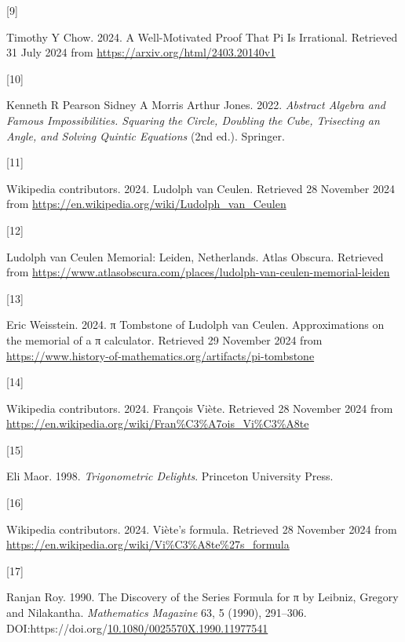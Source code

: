 \documentclass[
  a4paper,
]{article}
\newlength{\cslhangindent}
\newlength{\csllabelwidth}
\newenvironment{CSLReferences}[2] %
 {\begin{list}{}{%
  \setlength{\itemindent}{0pt}
  \setlength{\leftmargin}{0pt}
  \setlength{\parsep}{0pt}
  \ifodd #1
   \setlength{\leftmargin}{\cslhangindent}
   \setlength{\itemindent}{-1\cslhangindent}
  \fi
  \setlength{\itemsep}{#2\baselineskip}}}
 {\end{list}}
\newcommand{\CSLLeftMargin}[1]{\parbox[t]{\csllabelwidth}{\strut#1\strut}}
\newcommand{\CSLRightInline}[1]{\parbox[t]{\linewidth - \csllabelwidth}{\strut#1\strut}}
\begin{document}
\begin{CSLReferences}{0}{0}
\CSLLeftMargin{{[}9{]} }%
\CSLRightInline{Timothy Y Chow. 2024. {A Well-Motivated Proof That Pi Is
Irrational}. Retrieved 31 July 2024 from
\url{https://arxiv.org/html/2403.20140v1}}

\CSLLeftMargin{{[}10{]} }%
\CSLRightInline{Kenneth R Pearson Sidney A Morris Arthur Jones. 2022.
\emph{{Abstract Algebra and Famous Impossibilities}. {Squaring the
Circle, Doubling the Cube, Trisecting an Angle, and Solving Quintic
Equations}} (2nd ed.). Springer.}

\CSLLeftMargin{{[}11{]} }%
\CSLRightInline{Wikipedia contributors. 2024. {Ludolph van Ceulen}.
Retrieved 28 November 2024 from
\url{https://en.wikipedia.org/wiki/Ludolph_van_Ceulen}}

\CSLLeftMargin{{[}12{]} }%
\CSLRightInline{{Ludolph van Ceulen Memorial: Leiden, Netherlands}.
{Atlas Obscura}. Retrieved from
\url{https://www.atlasobscura.com/places/ludolph-van-ceulen-memorial-leiden}}

\CSLLeftMargin{{[}13{]} }%
\CSLRightInline{Eric Weisstein. 2024. {π Tombstone of Ludolph van
Ceulen}. {Approximations on the memorial of a π calculator}. Retrieved
29 November 2024 from
\url{https://www.history-of-mathematics.org/artifacts/pi-tombstone}}

\CSLLeftMargin{{[}14{]} }%
\CSLRightInline{Wikipedia contributors. 2024. {François Viète}.
Retrieved 28 November 2024 from
\url{https://en.wikipedia.org/wiki/Fran\%C3\%A7ois_Vi\%C3\%A8te}}

\CSLLeftMargin{{[}15{]} }%
\CSLRightInline{Eli Maor. 1998. \emph{{Trigonometric Delights}}.
Princeton University Press.}

\CSLLeftMargin{{[}16{]} }%
\CSLRightInline{Wikipedia contributors. 2024. {Viète's formula}.
Retrieved 28 November 2024 from
\url{https://en.wikipedia.org/wiki/Vi\%C3\%A8te\%27s_formula}}

\CSLLeftMargin{{[}17{]} }%
\CSLRightInline{Ranjan Roy. 1990. {The Discovery of the Series Formula
for π by Leibniz, Gregory and Nilakantha}. \emph{{Mathematics Magazine}}
63, 5 (1990), 291--306.
DOI:https://doi.org/\href{https://doi.org/10.1080/0025570X.1990.11977541}{10.1080/0025570X.1990.11977541}}


\end{CSLReferences}
\end{document}
